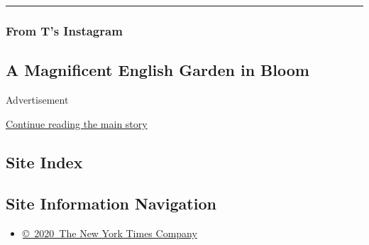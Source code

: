 \begin{center}\rule{0.5\linewidth}{\linethickness}\end{center}

\hypertarget{from-ts-instagram}{%
\subsubsection{From T's Instagram}\label{from-ts-instagram}}

\hypertarget{a-magnificent-english-garden-in-bloom}{%
\subsection{A Magnificent English Garden in
Bloom}\label{a-magnificent-english-garden-in-bloom}}

Advertisement

\protect\hyperlink{after-bottom}{Continue reading the main story}

\hypertarget{site-index}{%
\subsection{Site Index}\label{site-index}}

\hypertarget{site-information-navigation}{%
\subsection{Site Information
Navigation}\label{site-information-navigation}}

\begin{itemize}
\tightlist
\item
  \href{https://help.nytimes3xbfgragh.onion/hc/en-us/articles/115014792127-Copyright-notice}{©~2020~The
  New York Times Company}
\end{itemize}

